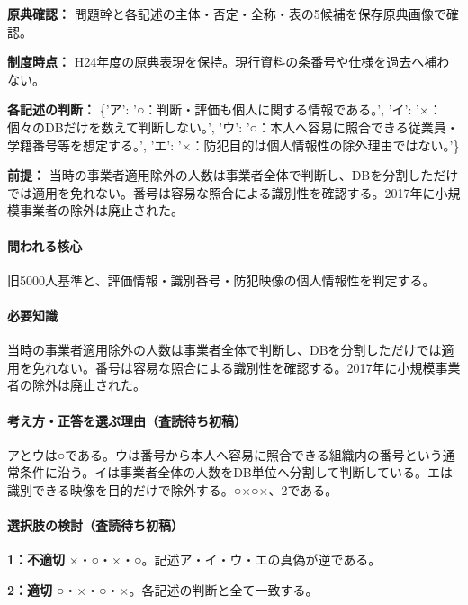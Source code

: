 \noindent\textbf{原典確認：} 問題幹と各記述の主体・否定・全称・表の5候補を保存原典画像で確認。\par

\noindent\textbf{制度時点：} H24年度の原典表現を保持。現行資料の条番号や仕様を過去へ補わない。\par

\noindent\textbf{各記述の判断：} \{'ア': '○：判断・評価も個人に関する情報である。', 'イ': '×：個々のDBだけを数えて判断しない。', 'ウ': '○：本人へ容易に照合できる従業員・学籍番号等を想定する。', 'エ': '×：防犯目的は個人情報性の除外理由ではない。'\}\par

\noindent\textbf{前提：} 当時の事業者適用除外の人数は事業者全体で判断し、DBを分割しただけでは適用を免れない。番号は容易な照合による識別性を確認する。2017年に小規模事業者の除外は廃止された。\par

\paragraph{問われる核心} 旧5000人基準と、評価情報・識別番号・防犯映像の個人情報性を判定する。

\paragraph{必要知識} 当時の事業者適用除外の人数は事業者全体で判断し、DBを分割しただけでは適用を免れない。番号は容易な照合による識別性を確認する。2017年に小規模事業者の除外は廃止された。

\paragraph{考え方・正答を選ぶ理由（査読待ち初稿）} アとウは○である。ウは番号から本人へ容易に照合できる組織内の番号という通常条件に沿う。イは事業者全体の人数をDB単位へ分割して判断している。エは識別できる映像を目的だけで除外する。○×○×、2である。

\paragraph{選択肢の検討（査読待ち初稿）}\mbox{}\par

\noindent\textbf{1：不適切} ×・○・×・○。記述ア・イ・ウ・エの真偽が逆である。\par

\noindent\textbf{2：適切} ○・×・○・×。各記述の判断と全て一致する。\par


